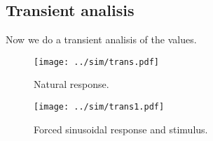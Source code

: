 \subsection{Transient analisis}

Now we do a transient analisis of the values.

\begin{figure}[h] \centering
\texttt{[image: ../sim/trans.pdf]}
\caption{Natural response.}
\label{fig:forced}
\end{figure}


\begin{figure}[h] \centering
\texttt{[image: ../sim/trans1.pdf]}
\caption{Forced sinusoidal response and stimulus.}
\label{fig:forced}
\end{figure}
